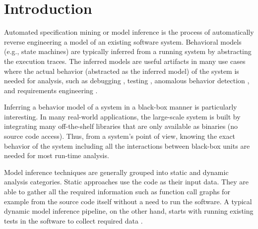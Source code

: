 \chapter{Introduction}
\label{sec:intro}
Automated specification mining or model inference \cite{lo2011mining} is the process of automatically reverse engineering a model of an existing software system. Behavioral models (e.g., state machines) are typically inferred from a running system by abstracting the execution traces. The inferred models are useful artifacts in many use cases where the actual behavior (abstracted as the inferred model) of the system is needed for analysis, such as debugging \cite{hybriddebugging, shang2013assisting, jafar2019interactive}, testing \cite{Walkinshaw2018TestingBlackBox, ModelBasedTesting, Papadopoulos2015, dallmeier2011automatically}, anomalous behavior detection \cite{valdes2000adaptive}, and requirements engineering \cite{damas2005generating}. 

Inferring a behavior model of a system in a black-box manner is particularly interesting. In many real-world applications, the large-scale system is built by integrating many off-the-shelf libraries that are only available as binaries (no source code access). Thus, from a system's point of view, knowing the exact behavior of the system including all the interactions between black-box units are needed for most run-time analysis. 

Model inference techniques are generally grouped into static and dynamic analysis categories. 
Static approaches use the code as their input data. They are able to gather all the required information such as function call graphs for example from the source code itself without a need to run the software.
A typical dynamic model inference pipeline, on the other hand, starts with running existing tests in the software to collect required data \cite{Papadopoulos2015}.


